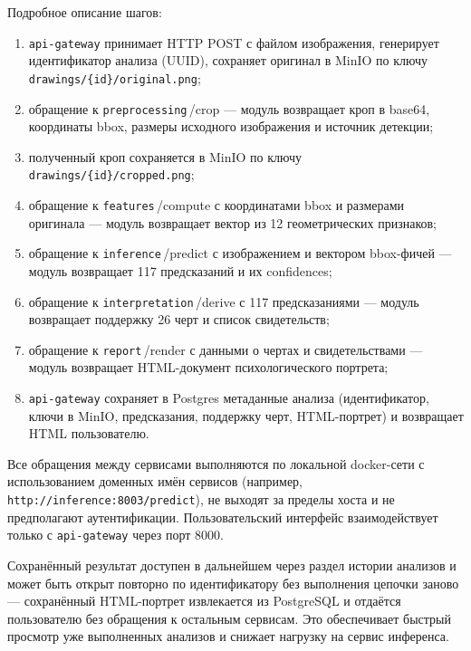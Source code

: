 Подробное описание шагов:

\begin{enumerate}
    \item \texttt{api-gateway} принимает HTTP POST с файлом изображения, генерирует идентификатор анализа (UUID), сохраняет оригинал в MinIO по ключу \texttt{drawings/\{id\}/original.png};
    \item обращение к \texttt{preprocessing}\,/crop --- модуль возвращает кроп в base64, координаты bbox, размеры исходного изображения и источник детекции;
    \item полученный кроп сохраняется в MinIO по ключу \texttt{drawings/\{id\}/cropped.png};
    \item обращение к \texttt{features}\,/compute с координатами bbox и размерами оригинала --- модуль возвращает вектор из 12 геометрических признаков;
    \item обращение к \texttt{inference}\,/predict с изображением и вектором bbox-фичей --- модуль возвращает 117 предсказаний и их confidences;
    \item обращение к \texttt{interpretation}\,/derive с 117 предсказаниями --- модуль возвращает поддержку 26 черт и список свидетельств;
    \item обращение к \texttt{report}\,/render с данными о чертах и свидетельствами --- модуль возвращает HTML-документ психологического портрета;
    \item \texttt{api-gateway} сохраняет в Postgres метаданные анализа (идентификатор, ключи в MinIO, предсказания, поддержку черт, HTML-портрет) и возвращает HTML пользователю.
\end{enumerate}

Все обращения между сервисами выполняются по локальной docker-сети с использованием доменных имён сервисов (например, \texttt{http://inference:8003/predict}), не выходят за пределы хоста и не предполагают аутентификации. Пользовательский интерфейс взаимодействует только с \texttt{api-gateway} через порт 8000.

Сохранённый результат доступен в дальнейшем через раздел истории анализов и может быть открыт повторно по идентификатору без выполнения цепочки заново --- сохранённый HTML-портрет извлекается из PostgreSQL и отдаётся пользователю без обращения к остальным сервисам. Это обеспечивает быстрый просмотр уже выполненных анализов и снижает нагрузку на сервис инференса.
